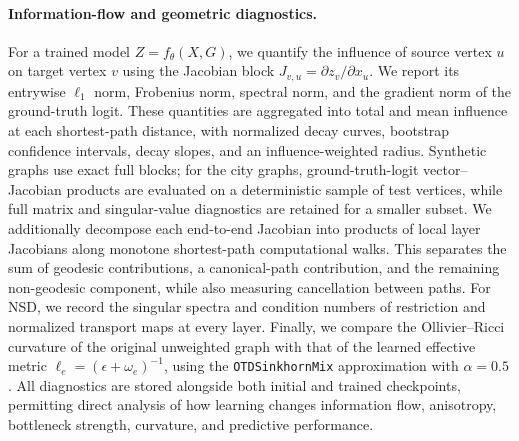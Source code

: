 \paragraph{Information-flow and geometric diagnostics.}
For a trained model \(Z=f_\theta(X,G)\), we quantify the influence of source
vertex \(u\) on target vertex \(v\) using the Jacobian block
\(J_{v,u}=\partial z_v/\partial x_u\). We report its entrywise
\(\ell_1\) norm, Frobenius norm, spectral norm, and the gradient norm of the
ground-truth logit. These quantities are aggregated into total and mean
influence at each shortest-path distance, with normalized decay curves,
bootstrap confidence intervals, decay slopes, and an influence-weighted
radius. Synthetic graphs use exact full blocks; for the city graphs,
ground-truth-logit vector--Jacobian products are evaluated on a deterministic
sample of test vertices, while full matrix and singular-value diagnostics are
retained for a smaller subset. We additionally decompose each end-to-end
Jacobian into products of local layer Jacobians along monotone shortest-path
computational walks. This separates the sum of geodesic contributions, a
canonical-path contribution, and the remaining non-geodesic component, while
also measuring cancellation between paths. For NSD, we record the singular
spectra and condition numbers of restriction and normalized transport maps at
every layer. Finally, we compare the Ollivier--Ricci curvature of the original
unweighted graph with that of the learned effective metric
\(\ell_e=(\epsilon+\omega_e)^{-1}\), using the
\texttt{OTDSinkhornMix} approximation with \(\alpha=0.5\). All diagnostics are
stored alongside both initial and trained checkpoints, permitting direct
analysis of how learning changes information flow, anisotropy, bottleneck
strength, curvature, and predictive performance.
